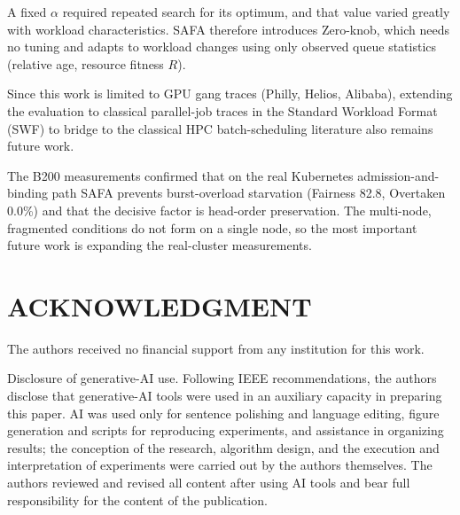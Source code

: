 \documentclass{ieeetj}
\begin{document}
A fixed $\alpha$ required repeated search for its optimum, and that value varied greatly with workload characteristics. SAFA therefore introduces Zero-knob, which needs no tuning and adapts to workload changes using only observed queue statistics (relative age, resource fitness $R$).

Since this work is limited to GPU gang traces (Philly, Helios, Alibaba), extending the evaluation to classical parallel-job traces in the Standard Workload Format (SWF) to bridge to the classical HPC batch-scheduling literature also remains future work.

The B200 measurements confirmed that on the real Kubernetes admission-and-binding path SAFA prevents burst-overload starvation (Fairness 82.8, Overtaken 0.0\%) and that the decisive factor is head-order preservation. The multi-node, fragmented conditions do not form on a single node, so the most important future work is expanding the real-cluster measurements.

\FloatBarrier
\section*{ACKNOWLEDGMENT}
The authors received no financial support from any institution for this work.

Disclosure of generative-AI use. Following IEEE recommendations, the authors disclose that generative-AI tools were used in an auxiliary capacity in preparing this paper. AI was used only for sentence polishing and language editing, figure generation and scripts for reproducing experiments, and assistance in organizing results; the conception of the research, algorithm design, and the execution and interpretation of experiments were carried out by the authors themselves. The authors reviewed and revised all content after using AI tools and bear full responsibility for the content of the publication.



\end{document}
